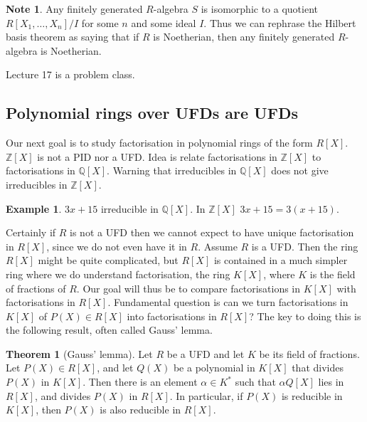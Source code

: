 \documentclass{article}
\newcommand{\Z}{\mathbb{Z}}
\newcommand{\Q}{\mathbb{Q}}
\newcommand{\rb}[1]{\left( #1 \right)}
\renewcommand{\sb}[1]{\left[ #1 \right]}
\theoremstyle{definition}\newtheorem{definition}{Definition}[subsection]
\theoremstyle{definition}\newtheorem{remark}[definition]{Remark}
\theoremstyle{definition}\newtheorem*{example}{Example}
\theoremstyle{definition}\newtheorem*{note}{Note}
\newtheorem{theorem}[definition]{Theorem}
\begin{document}
\begin{note}
Any finitely generated $ R $-algebra $ S $ is isomorphic to a quotient $ R\sb{X_1, \dots, X_n} / I $ for some $ n $ and some ideal $ I $. Thus we can rephrase the Hilbert basis theorem as saying that if $ R $ is Noetherian, then any finitely generated $ R $-algebra is Noetherian.
\end{note}


Lecture 17 is a problem class.


\subsection{Polynomial rings over UFDs are UFDs}

Our next goal is to study factorisation in polynomial rings of the form $ R\sb{X} $. $ \Z\sb{X} $ is not a PID nor a UFD. Idea is relate factorisations in $ \Z\sb{X} $ to factorisations in $ \Q\sb{X} $. Warning that irreducibles in $ \Q\sb{X} $ does not give irreducibles in $ \Z\sb{X} $.

\begin{example}
$ 3x + 15 $ irreducible in $ \Q\sb{X} $. In $ \Z\sb{X} $ $ 3x + 15 = 3\rb{x + 15} $.
\end{example}

Certainly if $ R $ is not a UFD then we cannot expect to have unique factorisation in $ R\sb{X} $, since we do not even have it in $ R $. Assume $ R $ is a UFD. Then the ring $ R\sb{X} $ might be quite complicated, but $ R\sb{X} $ is contained in a much simpler ring where we do understand factorisation, the ring $ K\sb{X} $, where $ K $ is the field of fractions of $ R $. Our goal will thus be to compare factorisations in $ K\sb{X} $ with factorisations in $ R\sb{X} $. Fundamental question is can we turn factorisations in $ K\sb{X} $ of $ P\rb{X} \in R\sb{X} $ into factorisations in $ R\sb{X} $? The key to doing this is the following result, often called Gauss' lemma.

\begin{theorem}[Gauss' lemma]
\label{thm:9.2.1}
Let $ R $ be a UFD and let $ K $ be its field of fractions. Let $ P\rb{X} \in R\sb{X} $, and let $ Q\rb{X} $ be a polynomial in $ K\sb{X} $ that divides $ P\rb{X} $ in $ K\sb{X} $. Then there is an element $ \alpha \in K^* $ such that $ \alpha Q\sb{X} $ lies in $ R\sb{X} $, and divides $ P\rb{X} $ in $ R\sb{X} $. In particular, if $ P\rb{X} $ is reducible in $ K\sb{X} $, then $ P\rb{X} $ is also reducible in $ R\sb{X} $.
\end{theorem}
\end{document}
